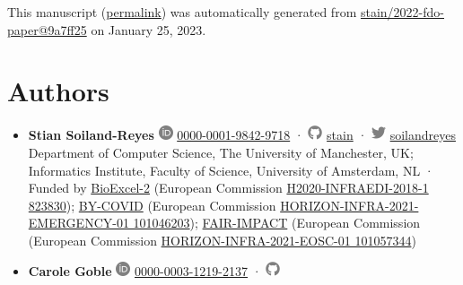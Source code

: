 This manuscript
(\href{https://stain.github.io/2022-fdo-paper/v/9a7ff254f386b2d4c6b95bea2ca71d9e215395b0/}{permalink})
was automatically generated
from \href{https://github.com/stain/2022-fdo-paper/tree/9a7ff254f386b2d4c6b95bea2ca71d9e215395b0}{stain/2022-fdo-paper@9a7ff25}
on January 25, 2023.

\hypertarget{authors}{%
\section*{Authors}\label{authors}}

\begin{itemize}
\item
  \textbf{Stian Soiland-Reyes}
  \includegraphics[width=0.16667in,height=0.16667in]{images/orcid.svg}
  \href{https://orcid.org/0000-0001-9842-9718}{0000-0001-9842-9718}
  · \includegraphics[width=0.16667in,height=0.16667in]{images/github.svg}
  \href{https://github.com/stain}{stain}
  · \includegraphics[width=0.16667in,height=0.16667in]{images/twitter.svg}
  \href{https://twitter.com/soilandreyes}{soilandreyes}
  Department of Computer Science, The University of Manchester, UK; Informatics Institute, Faculty of Science, University of Amsterdam, NL
  · Funded by \href{https://bioexcel.eu/}{BioExcel-2} (European Commission \href{https://cordis.europa.eu/project/id/823830}{H2020-INFRAEDI-2018-1 823830}); \href{https://by-covid.eu/}{BY-COVID} (European Commission \href{https://cordis.europa.eu/project/id/101046203}{HORIZON-INFRA-2021-EMERGENCY-01 101046203}); \href{http://www.fair-impact.eu/}{FAIR-IMPACT} (European Commission (European Commission \href{https://cordis.europa.eu/project/id/101057344}{HORIZON-INFRA-2021-EOSC-01 101057344})
\item
  \textbf{Carole Goble}
  \includegraphics[width=0.16667in,height=0.16667in]{images/orcid.svg}
  \href{https://orcid.org/0000-0003-1219-2137}{0000-0003-1219-2137}
  · \includegraphics[width=0.16667in,height=0.16667in]{images/github.svg}

\end{itemize}
